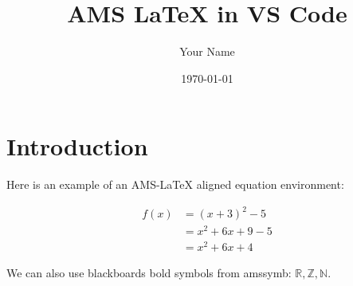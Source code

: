 \documentclass{article}
\title{AMS LaTeX in VS Code}
\author{Your Name}
\date{\today}
\begin{document}
\maketitle

\section{Introduction}
Here is an example of an AMS-LaTeX aligned equation environment:

\begin{align}
    f(x) &= (x + 3)^2 - 5 \\
    &= x^2 + 6x + 9 - 5 \\
    &= x^2 + 6x + 4
\end{align}

We can also use blackboards bold symbols from amssymb: $\mathbb{R}, \mathbb{Z}, \mathbb{N}$.
\end{document}

